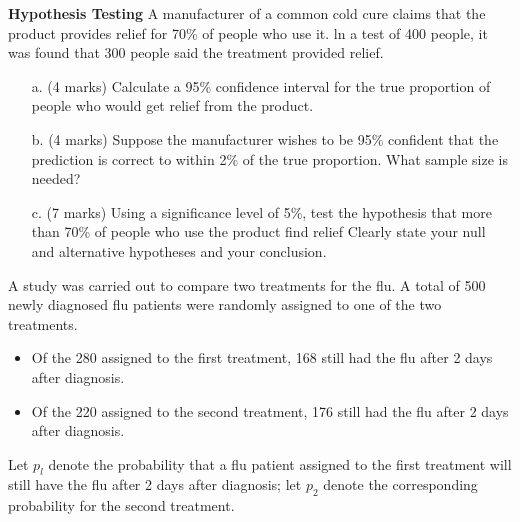 \documentclass[]{report}
\begin{document}
\textbf{Hypothesis Testing}
	A manufacturer of a common cold cure claims that the product provides
	relief for 70\% of people who use it. ln a test of 400 people, it was found
	that 300 people said the treatment provided relief.
	
	\begin{itemize}
		\item[a.](4 marks) Calculate a 95\% confidence interval for the true proportion of
		people who would get relief from the product.
		
		\item[b.](4 marks) Suppose the manufacturer wishes to be 95\% confident that the
		prediction is correct to within 2\% of the true proportion. What
		sample size is needed?
		
		\item[c.](7 marks) Using a significance level of 5\%, test the hypothesis that more than
		70\% of people who use the product find relief Clearly state your
		null and alternative hypotheses and your conclusion.
	\end{itemize}
	
	\newpage
\large  %
\noindent A study was carried out to compare two treatments for the flu. A total of 500
	newly diagnosed flu patients were randomly assigned to one of the two treatments.
	\begin{itemize}
		\item Of the 280 assigned to the first treatment, 168 still had the flu after 2 days after
		diagnosis. \item Of the 220 assigned to the second treatment, 176 still had the flu after 2
		days after diagnosis. \end{itemize} 
		
Let $p_l$ denote the probability that a flu patient assigned to the
	first treatment will still have the flu after 2 days after diagnosis; let $p_2$ denote the
	corresponding probability for the second treatment.
	
	
	
	
\end{document}
